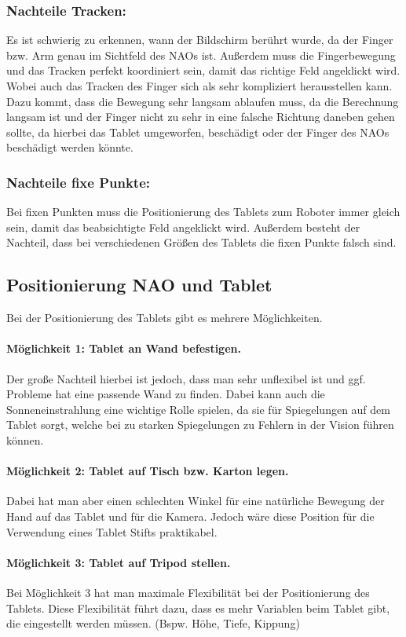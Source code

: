\subsubsection{Nachteile Tracken:}
Es ist schwierig zu erkennen, wann der Bildschirm berührt wurde, da der Finger bzw. Arm genau im Sichtfeld des NAOs ist.
Außerdem muss die Fingerbewegung und das Tracken perfekt koordiniert sein, damit das richtige Feld angeklickt wird. Wobei auch das Tracken des Finger sich als sehr kompliziert herausstellen kann.
Dazu kommt, dass die Bewegung sehr langsam ablaufen muss, da die Berechnung langsam ist und der Finger nicht zu sehr in eine falsche Richtung daneben gehen sollte, da hierbei das Tablet umgeworfen, beschädigt oder der Finger des NAOs beschädigt werden könnte.

\subsubsection{Nachteile fixe Punkte:}
Bei fixen Punkten muss die Positionierung des Tablets zum Roboter immer gleich sein, damit das beabsichtigte Feld angeklickt wird. Außerdem besteht der Nachteil, dass bei verschiedenen Größen des Tablets die fixen Punkte falsch sind. 

\subsection{Positionierung NAO und Tablet}
Bei der Positionierung des Tablets gibt es mehrere Möglichkeiten. 
\paragraph{Möglichkeit 1: Tablet an Wand befestigen.}
Der große Nachteil hierbei ist jedoch, dass man sehr unflexibel ist und ggf. Probleme hat eine passende Wand zu finden. Dabei kann auch die Sonneneinstrahlung eine wichtige Rolle spielen, da sie für Spiegelungen auf dem Tablet sorgt, welche bei zu starken Spiegelungen zu Fehlern in der Vision führen können.
\paragraph{Möglichkeit 2: Tablet auf Tisch bzw. Karton legen.}
Dabei hat man aber einen schlechten Winkel für eine natürliche Bewegung der Hand auf das Tablet und für die Kamera. Jedoch wäre diese Position für die Verwendung eines Tablet Stifts praktikabel.
\paragraph{Möglichkeit 3: Tablet auf Tripod stellen.}
Bei Möglichkeit 3 hat man maximale Flexibilität bei der Positionierung des Tablets. Diese Flexibilität führt dazu, dass es mehr Variablen beim Tablet gibt, die eingestellt werden müssen. (Bspw. Höhe, Tiefe, Kippung)

